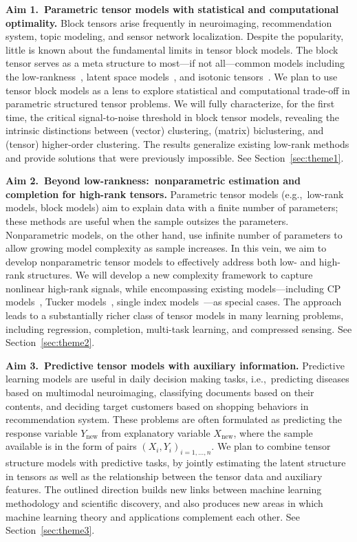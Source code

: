 \documentclass[11pt]{article}
\theoremstyle{exampstyle}
\theoremstyle{definition}
\begin{document}
{\bf  Aim 1.\ Parametric tensor models with statistical and computational optimality.} Block tensors arise frequently in neuroimaging, recommendation system, topic modeling, and sensor network localization. Despite the popularity, little is known about the fundamental limits in tensor block models. The block tensor serves as a meta structure to most---if not all---common models including the low-rankness~\cite{young2018universality}, latent space models~\cite{wang2018learning}, and isotonic tensors~\cite{pananjady2020isotonic}. We plan to use tensor block models as a lens to explore statistical and computational trade-off in parametric structured tensor problems. We will fully characterize, for the first time, the critical signal-to-noise threshold in block tensor models, revealing the intrinsic distinctions between (vector) clustering, (matrix) biclustering, and (tensor) higher-order clustering. The results generalize existing low-rank methods and provide solutions that were previously impossible. See Section~\ref{sec:theme1}.

{\bf Aim 2.\ Beyond low-rankness:\ nonparametric estimation and completion for high-rank tensors.} Parametric tensor models (e.g.,\ low-rank models, block models) aim to explain data with a finite number of parameters; these methods are useful when the sample outsizes the parameters. Nonparametric models, on the other hand, use infinite number of parameters to allow growing model complexity as sample increases. In this vein, we aim to develop nonparametric tensor models to effectively address both low- and high-rank structures. We will develop a new complexity framework to capture nonlinear high-rank signals, while encompassing existing models---including CP models~\cite{kolda2009tensor}, Tucker models~\cite{de2000multilinear}, single index models~\cite{ganti2015matrix}---as special cases. The approach leads to a substantially richer class of tensor models in many learning problems, including regression, completion, multi-task learning, and compressed sensing. See Section~\ref{sec:theme2}.

{\bf Aim 3.\ Predictive tensor models with auxiliary information.}
Predictive learning models are useful in daily decision making tasks, i.e.,\ predicting diseases based on multimodal neuroimaging, classifying documents based on their contents, and deciding target customers based on shopping behaviors in recommendation system. These problems are often formulated as predicting the response variable $Y_{\text{new}}$ from explanatory variable $X_{\text{new}}$, where the sample available is in the form of pairs $(X_i, Y_i)_{i=1,\ldots,n}$. We plan to combine tensor structure models with predictive tasks, by jointly estimating the latent structure in tensors as well as the relationship between the tensor data and auxiliary features. The outlined direction builds new links between machine learning methodology and scientific discovery, and also produces new areas in which machine learning theory and applications complement each other. See Section~\ref{sec:theme3}. 
\end{document}
